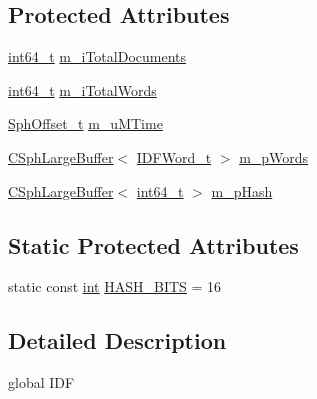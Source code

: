 \subsection*{Protected Attributes}
\begin{DoxyCompactItemize}
\item 
\hyperlink{sphinxstd_8h_a996e72f71b11a5bb8b3b7b6936b1516d}{int64\-\_\-t} \hyperlink{classCSphGlobalIDF_a4e2c491cfd8f5fb511050ad67b153e45}{m\-\_\-i\-Total\-Documents}
\item 
\hyperlink{sphinxstd_8h_a996e72f71b11a5bb8b3b7b6936b1516d}{int64\-\_\-t} \hyperlink{classCSphGlobalIDF_ab580759ecbff60fdb05e9c321d72a50a}{m\-\_\-i\-Total\-Words}
\item 
\hyperlink{sphinx_8h_a0fb3b64afebef33c61367714754eaa90}{Sph\-Offset\-\_\-t} \hyperlink{classCSphGlobalIDF_a7c40a38a9cf3c45f4b36c425544c5cc2}{m\-\_\-u\-M\-Time}
\item 
\hyperlink{classCSphLargeBuffer}{C\-Sph\-Large\-Buffer}$<$ \hyperlink{structCSphGlobalIDF_1_1IDFWord__t}{I\-D\-F\-Word\-\_\-t} $>$ \hyperlink{classCSphGlobalIDF_aaf1d6ddda9624572339cfe2ad63b4dee}{m\-\_\-p\-Words}
\item 
\hyperlink{classCSphLargeBuffer}{C\-Sph\-Large\-Buffer}$<$ \hyperlink{sphinxstd_8h_a996e72f71b11a5bb8b3b7b6936b1516d}{int64\-\_\-t} $>$ \hyperlink{classCSphGlobalIDF_a5fe872e48d7691579e1d644a71eb5eea}{m\-\_\-p\-Hash}
\end{DoxyCompactItemize}
\subsection*{Static Protected Attributes}
\begin{DoxyCompactItemize}
\item 
static const \hyperlink{sphinxexpr_8cpp_a4a26e8f9cb8b736e0c4cbf4d16de985e}{int} \hyperlink{classCSphGlobalIDF_a2be32ad7189c084316e8ef271a568ca9}{H\-A\-S\-H\-\_\-\-B\-I\-T\-S} = 16
\end{DoxyCompactItemize}


\subsection{Detailed Description}
global I\-D\-F 

